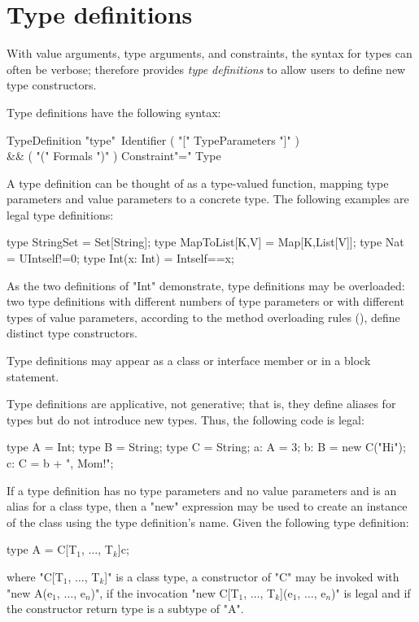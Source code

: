 
\section{Type definitions}

With value arguments, type arguments, and constraints, the
syntax for \Xten{} types can often be verbose;
\Xten{} therefore provides {\em type definitions}
to allow users to define new type constructors.

Type definitions have the following syntax:

\begin{grammar}
TypeDefinition \: 
                \xcd"type"~Identifier
                           ( \xcd"[" TypeParameters \xcd"]" )\opt \\
                        && ( \xcd"(" Formals \xcd")" )\opt
                            Constraint\opt \xcd"=" Type \\
\end{grammar}

\noindent
A type definition can be thought of as a type-valued function,
mapping type parameters and value parameters to a concrete type.
%
The following examples are legal type definitions:
\begin{xten}
type StringSet = Set[String];
type MapToList[K,V] = Map[K,List[V]];
type Nat = UInt{self!=0};
type Int(x: Int) = Int{self==x};
\end{xten}

As the two definitions of \xcd"Int" demonstrate, type definitions may 
be overloaded: two type definitions with different numbers of type
parameters or with different types of value
parameters, according to the method overloading rules
(), define distinct type constructors.

Type definitions may appear as a class or interface member or
in a block statement.

Type definitions are applicative, not generative; that is, they
define aliases for types but do not introduce new types.
Thus, the following code is legal:
\begin{xten}
type A = Int;
type B = String;
type C = String;
a: A = 3;
b: B = new C("Hi");
c: C = b + ", Mom!";
\end{xten}
If a type definition has no type parameters and no value
parameters and is an alias for a class type, then a \xcd"new"
expression may be used to create an instance of the class using
the type definition's name.
Given the following type definition:
\begin{xtenmath}
type A = C[T$_1$, $\dots$, T$_k$]{c};
\end{xtenmath}
where 
\xcdmath"C[T$_1$, $\dots$, T$_k$]" is a
class type, a constructor of \xcdmath"C" may be invoked with
\xcdmath"new A(e$_1$, $\dots$, e$_n$)", if the
invocation
\xcdmath"new C[T$_1$, $\dots$, T$_k$](e$_1$, $\dots$, e$_n$)" is
legal and if the constructor return type is a subtype of
\xcd"A".

